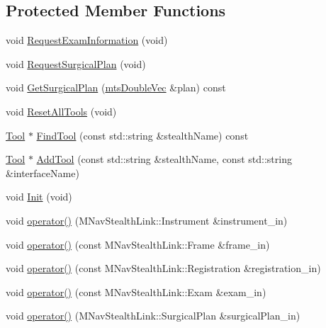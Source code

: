 \subsection*{Protected Member Functions}
\begin{DoxyCompactItemize}
\item 
void \hyperlink{classmts_medtronic_stealthlink_ae06f8fd7e621ea1402a751d335a94769}{Request\-Exam\-Information} (void)
\item 
void \hyperlink{classmts_medtronic_stealthlink_a44ff78af55d1dafdf41baaf3657ebc24}{Request\-Surgical\-Plan} (void)
\item 
void \hyperlink{classmts_medtronic_stealthlink_ae60211f430f60cd11a37156a53eaa1dc}{Get\-Surgical\-Plan} (\hyperlink{mts_vector_8h_af69167a5dc2ad33eb93965b9387d8403}{mts\-Double\-Vec} \&plan) const 
\item 
void \hyperlink{classmts_medtronic_stealthlink_ad4b03cca497d5cbb450a1cef93ac64d7}{Reset\-All\-Tools} (void)
\item 
\hyperlink{classmts_medtronic_stealthlink_1_1_tool}{Tool} $\ast$ \hyperlink{classmts_medtronic_stealthlink_a183ea588664bf2850dc56405c7bea2bb}{Find\-Tool} (const std\-::string \&stealth\-Name) const 
\item 
\hyperlink{classmts_medtronic_stealthlink_1_1_tool}{Tool} $\ast$ \hyperlink{classmts_medtronic_stealthlink_a6f4b088bb06ecdb655e26c79f0612b25}{Add\-Tool} (const std\-::string \&stealth\-Name, const std\-::string \&interface\-Name)
\item 
void \hyperlink{classmts_medtronic_stealthlink_a8ff47edf8d1292a5c2ecee33a49b9923}{Init} (void)
\item 
void \hyperlink{classmts_medtronic_stealthlink_ab812b32d819a83e3d5b3c04749a71efd}{operator()} (M\-Nav\-Stealth\-Link\-::\-Instrument \&instrument\-\_\-in)
\item 
void \hyperlink{classmts_medtronic_stealthlink_a6a6352f68c6541b906923c8aec4560b5}{operator()} (const M\-Nav\-Stealth\-Link\-::\-Frame \&frame\-\_\-in)
\item 
void \hyperlink{classmts_medtronic_stealthlink_acdb93302db9bc6125a2b34bb49133ff5}{operator()} (const M\-Nav\-Stealth\-Link\-::\-Registration \&registration\-\_\-in)
\item 
void \hyperlink{classmts_medtronic_stealthlink_adff332df7664519d1f219224ae3a51b6}{operator()} (const M\-Nav\-Stealth\-Link\-::\-Exam \&exam\-\_\-in)
\item 
void \hyperlink{classmts_medtronic_stealthlink_a90f4d5213489fc6738c3a237fd32719b}{operator()} (M\-Nav\-Stealth\-Link\-::\-Surgical\-Plan \&surgical\-Plan\-\_\-in)
\end{DoxyCompactItemize}
